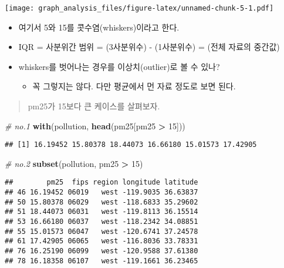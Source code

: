 \documentclass[
]{article}
\newenvironment{Shaded}{\begin{snugshade}}{\end{snugshade}}
\newcommand{\AttributeTok}[1]{\textcolor[rgb]{0.13,0.29,0.53}{#1}}
\newcommand{\CommentTok}[1]{\textcolor[rgb]{0.56,0.35,0.01}{\textit{#1}}}
\newcommand{\DecValTok}[1]{\textcolor[rgb]{0.00,0.00,0.81}{#1}}
\newcommand{\FunctionTok}[1]{\textcolor[rgb]{0.13,0.29,0.53}{\textbf{#1}}}
\newcommand{\NormalTok}[1]{#1}
\newcommand{\SpecialCharTok}[1]{\textcolor[rgb]{0.81,0.36,0.00}{\textbf{#1}}}
\newcommand{\StringTok}[1]{\textcolor[rgb]{0.31,0.60,0.02}{#1}}
\providecommand{\tightlist}{%
  \setlength{\itemsep}{0pt}\setlength{\parskip}{0pt}}
\begin{document}
\begin{Shaded}
\end{Shaded}

\texttt{[image: graph\_analysis\_files/figure-latex/unnamed-chunk-5-1.pdf]}

\begin{itemize}
\tightlist
\item
  여기서 5와 15를 콧수염(whiskers)이라고 한다.
\item
  IQR = 사분위간 범위 = (3사분위수) - (1사분위수) = (전체 자료의 중간값)
\item
  whiskers를 벗어나는 경우를 이상치(outlier)로 볼 수 있나?

  \begin{itemize}
  \tightlist
  \item
    꼭 그렇지는 않다. 다만 평균에서 먼 자료 정도로 보면 된다.
  \end{itemize}
\end{itemize}

\begin{quote}
pm25가 15보다 큰 케이스를 살펴보자.
\end{quote}

\begin{Shaded}
\begin{Highlighting}[]
\CommentTok{\# no.1}
\FunctionTok{with}\NormalTok{(pollution, }\FunctionTok{head}\NormalTok{(pm25[pm25 }\SpecialCharTok{\textgreater{}} \DecValTok{15}\NormalTok{]))}
\end{Highlighting}
\end{Shaded}

\begin{verbatim}
## [1] 16.19452 15.80378 18.44073 16.66180 15.01573 17.42905
\end{verbatim}

\begin{Shaded}
\begin{Highlighting}[]
\CommentTok{\# no.2}
\FunctionTok{subset}\NormalTok{(pollution, pm25 }\SpecialCharTok{\textgreater{}} \DecValTok{15}\NormalTok{)}
\end{Highlighting}
\end{Shaded}

\begin{verbatim}
##        pm25  fips region longitude latitude
## 46 16.19452 06019   west -119.9035 36.63837
## 50 15.80378 06029   west -118.6833 35.29602
## 51 18.44073 06031   west -119.8113 36.15514
## 53 16.66180 06037   west -118.2342 34.08851
## 55 15.01573 06047   west -120.6741 37.24578
## 61 17.42905 06065   west -116.8036 33.78331
## 76 16.25190 06099   west -120.9588 37.61380
## 78 16.18358 06107   west -119.1661 36.23465
\end{verbatim}
\end{document}
